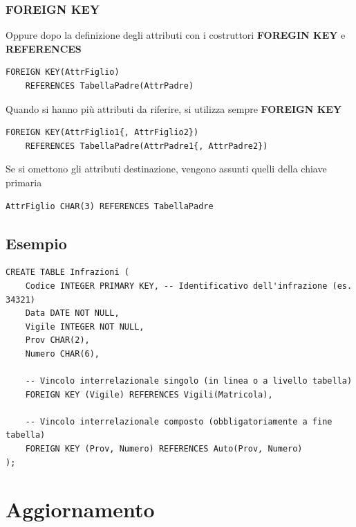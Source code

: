 \subsubsection{FOREIGN KEY}
Oppure dopo la definizione degli attributi con i costruttori \textbf{FOREGIN KEY} e \textbf{REFERENCES}
\begin{lstlisting}[language=sql_generic]
FOREIGN KEY(AttrFiglio)
    REFERENCES TabellaPadre(AttrPadre)
\end{lstlisting}

Quando si hanno più attributi da riferire, si utilizza sempre \textbf{FOREIGN KEY}
\begin{lstlisting}[language=sql_generic]
FOREIGN KEY(AttrFiglio1{, AttrFiglio2})
    REFERENCES TabellaPadre(AttrPadre1{, AttrPadre2})
\end{lstlisting}

Se si omettono gli attributi destinazione, vengono assunti quelli della chiave primaria
\begin{lstlisting}[language=sql_generic]
AttrFiglio CHAR(3) REFERENCES TabellaPadre
\end{lstlisting}

\subsection{Esempio}
\begin{lstlisting}[language=sql_generic]
CREATE TABLE Infrazioni (
    Codice INTEGER PRIMARY KEY, -- Identificativo dell'infrazione (es. 34321)
    Data DATE NOT NULL,
    Vigile INTEGER NOT NULL,
    Prov CHAR(2),
    Numero CHAR(6),
    
    -- Vincolo interrelazionale singolo (in linea o a livello tabella)
    FOREIGN KEY (Vigile) REFERENCES Vigili(Matricola),
    
    -- Vincolo interrelazionale composto (obbligatoriamente a fine tabella)
    FOREIGN KEY (Prov, Numero) REFERENCES Auto(Prov, Numero)
);
\end{lstlisting}


\section{Aggiornamento}
